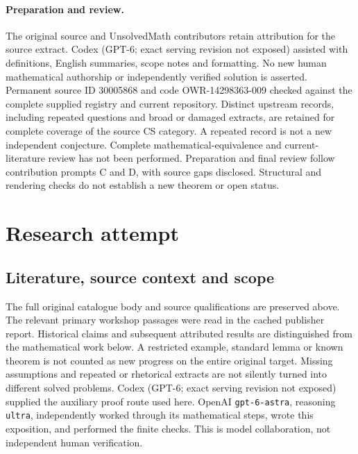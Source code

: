 \documentclass[11pt]{article}
\begin{document}
\paragraph{Preparation and review.}
The original source and UnsolvedMath contributors retain attribution for the source extract. Codex (GPT-6; exact serving revision not exposed) assisted with definitions, English summaries, scope notes and formatting. No new human mathematical authorship or independently verified solution is asserted. Permanent source ID 30005868 and code OWR-14298363-009 checked against the complete supplied registry and current repository. Distinct upstream records, including repeated questions and broad or damaged extracts, are retained for complete coverage of the source CS category. A repeated record is not a new independent conjecture. Complete mathematical-equivalence and current-literature review has not been performed. Preparation and final review follow contribution prompts C and D, with source gaps disclosed. Structural and rendering checks do not establish a new theorem or open status.
\label{end:30005868}

\section{Research attempt}
\subsection{Literature, source context and scope}
The full original catalogue body and source qualifications are preserved above. The relevant primary workshop passages were read in the cached publisher report. Historical claims and subsequent attributed results are distinguished from the mathematical work below. A restricted example, standard lemma or known theorem is not counted as new progress on the entire original target. Missing assumptions and repeated or rhetorical extracts are not silently turned into different solved problems.
Codex (GPT-6; exact serving revision not exposed) supplied the auxiliary proof route used here. OpenAI \texttt{gpt-6-astra}, reasoning \texttt{ultra}, independently worked through its mathematical steps, wrote this exposition, and performed the finite checks. This is model collaboration, not independent human verification.
\end{document}
